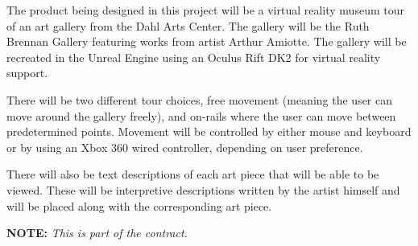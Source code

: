 

The product being designed in this project will be a virtual reality museum tour of an art gallery from the Dahl Arts Center.  The gallery will be the Ruth Brennan Gallery featuring works from artist Arthur Amiotte.  The gallery will be recreated in the Unreal Engine using an Oculus Rift DK2 for virtual reality support.  

There will be two different tour choices, free movement (meaning the user can move around the gallery freely), and on-rails where the user can move between predetermined points.  Movement will be controlled by either mouse and keyboard or by using an Xbox 360 wired controller, depending on user preference.

There will also be text descriptions of each art piece that will be able to be viewed.  These will be interpretive descriptions written by the artist himself and will be placed along with the corresponding art piece.  
\vspace{2\baselineskip}

\centerline{\Large {\bf NOTE:} {\em This is part of the contract.}}

